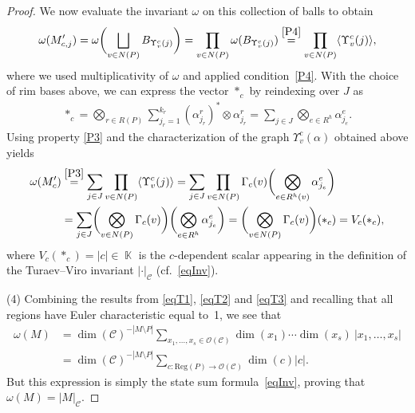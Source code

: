 \documentclass[pdftex]{sigma}
\DeclareMathOperator{\K}{\mathbb{K}}
\numberwithin{equation}{section}
\theoremstyle{definition}
\begin{document}
\begin{proof}
 We now evaluate the invariant $\omega$ on this collection of balls to obtain
 \begin{align*}
 \omega (M'_{c,j} ) = \omega\biggl(\bigsqcup_{v \in N(P)}B_{\Upsilon_v^c(j)}\biggr) = \prod_{v \in N(P)}\omega ( B_{\Upsilon_v^c(j)} ) \overset{\rm \ref{P4}}{=} \prod_{v \in N(P)} \langle \Upsilon_v^c(j) \rangle,
 \end{align*}
 where we used multiplicativity of $\omega$ and applied condition~\ref{P4}. With the choice of rim bases above, we can express the vector $*_c$ by reindexing over $J$ as
 \begin{align*}
 *_c = \bigotimes_{r \in R(P)} \sum_{j_r = 1}^{k_r} (\alpha_{j_r}^r)^* \otimes \alpha_{j_r}^r = \sum_{j \in J} \bigotimes_{e \in R^h} \alpha_{j_e}^e.
 \end{align*}
 Using property \ref{P3} and the characterization of the graph $\Upsilon_v^c(\alpha)$ obtained above yields
 \begin{align}
 \label{eqT3}
 \omega (M'_c ) &\overset{\rm \ref{P3}}{=} \sum_{j \in J} \prod_{v \in N(P)}\langle \Upsilon_v^c(j) \rangle = \sum_{j \in J} \prod_{v \in N(P)}\Gamma_c(v)\biggl( \bigotimes_{e \in R^h(v)} \alpha_{j_e}^e\biggr) \nonumber \\
 &= \sum_{j \in J} \biggl( \bigotimes_{v \in N(P)}\Gamma_c(v)\biggr)\biggl( \bigotimes_{e \in R^h} \alpha_{j_e}^e\biggr) = \biggl( \bigotimes_{v \in N(P)}\Gamma_c(v)\biggr)(*_c) = V_c(*_c),
 \end{align}
 where $V_c(*_c) = |c| \in \K$ is the $c$-dependent scalar appearing in the definition of the Turaev--Viro invariant $|\cdot|_{\mathcal{C}}$ (cf.~\eqref{eqInv}).

 (4) Combining the results from \eqref{eqT1}, \eqref{eqT2} and \eqref{eqT3} and recalling that all regions have Euler characteristic equal to~1, we see that{\samepage
 \begin{align*}
 \omega(M) &= \dim(\mathcal{C})^{-|M\setminus P|}\sum_{x_1, \dots, x_{s} \in \mathcal{O}({\mathcal{C}})} \dim(x_1) \cdots \dim(x_{s})\ |x_1, \dots, x_{s}| \\
 &= \dim(\mathcal{C})^{-|M\setminus P|} \sum_{c\colon \mathrm{Reg}(P) \rightarrow \mathcal{O}({\mathcal{C}})} \dim(c) |c|.
 \end{align*}
 But this expression is simply the state sum formula~\eqref{eqInv}, proving that $\omega(M) = |M|_{\mathcal{C}}$.}


\end{proof}
\end{document}
